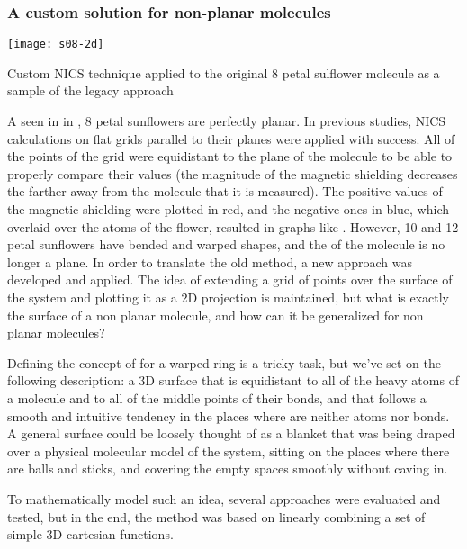 \subsubsection{A custom solution for non-planar molecules}

\begin{marginfigure}
    \texttt{[image: s08-2d]}
    \caption[NICS applied to sulflower]{Custom NICS technique applied to the original 8 petal sulflower molecule as a sample of the legacy approach}
\end{marginfigure}

A seen in  in , 8 petal sunflowers are perfectly planar.
In previous studies, NICS calculations on flat grids parallel to their planes were applied with success.
All of the points of the grid were equidistant to the plane of the molecule to be able to properly compare their values (the magnitude of the magnetic shielding decreases the farther away from the molecule that it is measured).
The positive values of the magnetic shielding were plotted in red, and the negative ones in blue, which overlaid over the atoms of the flower, resulted in graphs like .
However, 10 and 12 petal sunflowers have bended and warped shapes, and the  of the molecule is no longer a plane.
In order to translate the old method, a new approach was developed and applied.
The idea of extending a grid of points over the surface of the system and plotting it as a 2D projection is maintained, but what is exactly the surface of a non planar molecule, and how can it be generalized for non planar molecules?

Defining the concept of  for a warped ring is a tricky task, but we've set on the following description: a 3D surface that is equidistant to all of the heavy atoms of a molecule and to all of the middle points of their bonds, and that follows a smooth and intuitive tendency in the places where are neither atoms nor bonds. A general surface could be loosely thought of as a blanket that was being draped over a physical molecular model of the system, sitting on the places where there are balls and sticks, and covering the empty spaces smoothly without caving in.

To mathematically model such an idea, several approaches were evaluated and tested, but in the end, the method was based on linearly combining a set of simple 3D cartesian functions.

